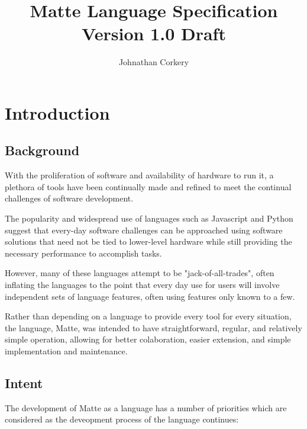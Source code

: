 \documentclass[12pt,letterpaper]{report}
\author{Johnathan Corkery}
\title{Matte Language Specification\\
\small Version 1.0 Draft
}
\begin{document}
\maketitle
\tableofcontents


\chapter{Introduction}
\section{Background}  

With the proliferation of software and availability of hardware to run it, a
plethora of tools have been continually made and refined to meet the 
continual challenges of software development. 

The popularity and widespread use of languages such as Javascript and 
Python suggest that every-day software challenges can be approached using 
software solutions that need not be tied to lower-level hardware while 
still providing the necessary performance to accomplish tasks.

However, many of these languages attempt to be "jack-of-all-trades", often 
inflating the languages to the point that every day use for users will involve
independent sets of language features, often using features only known to a few.

Rather than depending on a language to provide every tool for every situation,
the language, Matte, was intended to have straightforward, regular, and 
relatively simple operation, allowing for better colaboration, easier 
extension, and simple implementation and maintenance.
  
\section{Intent}

The development of Matte as a language has a number of priorities which are 
considered as the deveopment process of the language continues:
\end{document}
